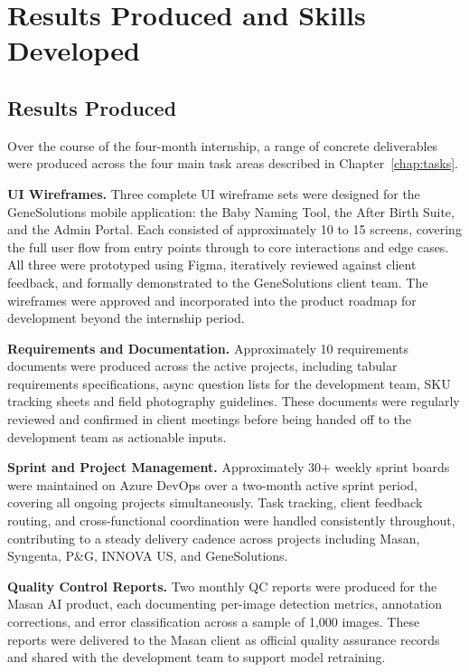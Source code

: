 \chapter{Results Produced and Skills Developed}
\label{chap:results}

\section{Results Produced}

Over the course of the four-month internship, a range of concrete deliverables were produced across the four main task areas described in Chapter~\ref{chap:tasks}.

\textbf{UI Wireframes.} Three complete UI wireframe sets were designed for the GeneSolutions mobile application: the Baby Naming Tool, the After Birth Suite, and the Admin Portal. Each consisted of approximately 10 to 15 screens, covering the full user flow from entry points through to core interactions and edge cases. All three were prototyped using Figma, iteratively reviewed against client feedback, and formally demonstrated to the GeneSolutions client team. The wireframes were approved and incorporated into the product roadmap for development beyond the internship period.

\textbf{Requirements and Documentation.} Approximately 10 requirements documents were produced across the active projects, including tabular requirements specifications, async question lists for the development team, SKU tracking sheets and field photography guidelines. These documents were regularly reviewed and confirmed in client meetings before being handed off to the development team as actionable inputs.

\textbf{Sprint and Project Management.} Approximately 30+ weekly sprint boards were maintained on Azure DevOps over a two-month active sprint period, covering all ongoing projects simultaneously. Task tracking, client feedback routing, and cross-functional coordination were handled consistently throughout, contributing to a steady delivery cadence across projects including Masan, Syngenta, P\&G, INNOVA US, and GeneSolutions.

\textbf{Quality Control Reports.} Two monthly QC reports were produced for the Masan AI product, each documenting per-image detection metrics, annotation corrections, and error classification across a sample of 1,000 images. These reports were delivered to the Masan client as official quality assurance records and shared with the development team to support model retraining.

